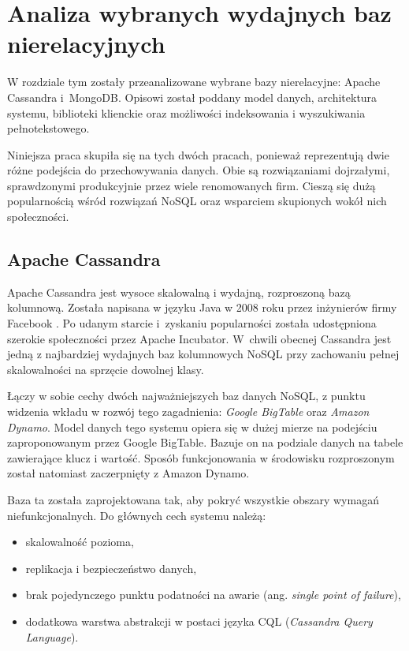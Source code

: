\chapter{Analiza wybranych wydajnych baz nierelacyjnych}

W rozdziale tym zostały przeanalizowane wybrane bazy nierelacyjne: Apache Cassandra i~MongoDB.
Opisowi został poddany model danych, architektura systemu, biblioteki klienckie oraz możliwości indeksowania i wyszukiwania pełnotekstowego. 

Niniejsza praca skupiła się na tych dwóch pracach, ponieważ reprezentują dwie różne podejścia do przechowywania danych. 
Obie są rozwiązaniami dojrzałymi, sprawdzonymi produkcyjnie przez wiele renomowanych firm.
Cieszą się dużą popularnością wśród rozwiązań NoSQL oraz wsparciem skupionych wokół nich społeczności.

\section{Apache Cassandra}

Apache Cassandra jest wysoce skalowalną i wydajną, rozproszoną bazą kolumnową.
Została napisana w języku Java w 2008 roku przez inżynierów firmy Facebook \cite{CassandraOrigins}.
Po udanym starcie i~zyskaniu popularności została udostępniona szerokie społeczności przez Apache Incubator.
W~chwili obecnej Cassandra jest jedną z najbardziej wydajnych baz kolumnowych NoSQL przy zachowaniu pełnej skalowalności na sprzęcie dowolnej klasy.

Łączy w sobie cechy dwóch najważniejszych baz danych NoSQL, z punktu widzenia wkładu w rozwój tego zagadnienia: \textit{Google BigTable} oraz \textit{Amazon Dynamo}.
Model danych tego systemu opiera się w dużej mierze na podejściu zaproponowanym przez Google BigTable.
Bazuje on na podziale danych na tabele zawierające klucz i wartość.
Sposób funkcjonowania w środowisku rozproszonym został natomiast zaczerpnięty z Amazon Dynamo.

Baza ta została zaprojektowana tak, aby pokryć wszystkie obszary wymagań niefunkcjonalnych.
Do głównych cech systemu należą:
\begin{itemize}
    \item skalowalność pozioma,
    \item replikacja i bezpieczeństwo danych,
    \item brak pojedynczego punktu podatności na awarie (ang. \textit{single point of failure}),
    \item dodatkowa warstwa abstrakcji w postaci języka CQL (\textit{Cassandra Query Language}).
\end{itemize}

